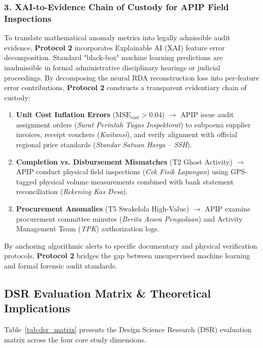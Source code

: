 \documentclass[runningheads]{llncs}
\begin{document}
\subsubsection{3. XAI-to-Evidence Chain of Custody for APIP Field Inspections}
To translate mathematical anomaly metrics into legally admissible audit evidence, \textbf{Protocol 2} incorporates Explainable AI (XAI) feature error decomposition. Standard "black-box" machine learning predictions are inadmissible in formal administrative disciplinary hearings or judicial proceedings. By decomposing the neural RDA reconstruction loss into per-feature error contributions, \textbf{Protocol 2} constructs a transparent evidentiary chain of custody:
\begin{enumerate}
    \item \textbf{Unit Cost Inflation Errors} ($\text{MSE}_{\text{cost}} > 0.04$) $\to$ APIP issue audit assignment orders (\textit{Surat Perintah Tugas Inspektorat}) to subpoena supplier invoices, receipt vouchers (\textit{Kwitansi}), and verify alignment with official regional price standards (\textit{Standar Satuan Harga -- SSH}).
    \item \textbf{Completion vs. Disbursement Mismatches} (T2 Ghost Activity) $\to$ APIP conduct physical field inspections (\textit{Cek Fisik Lapangan}) using GPS-tagged physical volume measurements combined with bank statement reconciliation (\textit{Rekening Kas Desa}).
    \item \textbf{Procurement Anomalies} (T5 Swakelola High-Value) $\to$ APIP examine procurement committee minutes (\textit{Berita Acara Pengadaan}) and Activity Management Team (\textit{TPK}) authorization logs.
\end{enumerate}
By anchoring algorithmic alerts to specific documentary and physical verification protocols, \textbf{Protocol 2} bridges the gap between unsupervised machine learning and formal forensic audit standards.

\subsection{DSR Evaluation Matrix \& Theoretical Implications}
Table~\ref{tab:dsr_matrix} presents the Design Science Research (DSR) evaluation matrix across the four core study dimensions.
\end{document}
